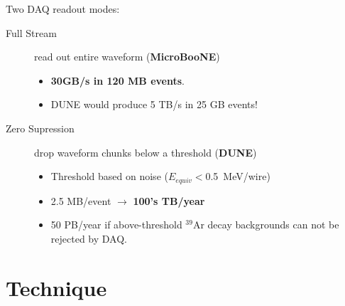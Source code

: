 \documentclass[xcolor=dvipsnames]{beamer}
\begin{document}
\begin{frame}
  \footnotesize
  Two DAQ readout modes:
  \begin{description}
  \item[Full Stream] read out entire waveform (\textbf{MicroBooNE})
    \begin{itemize}
    \item \textbf{30GB/s in 120 MB events}.
    \item DUNE would produce 5 TB/s in 25 GB events!
    \end{itemize}
  \item[Zero Supression] drop waveform chunks below a threshold (\textbf{DUNE})
    \begin{itemize}
    \item Threshold based on noise ($E_{equiv} <$\SI{0.5}{\mega\electronvolt}/wire)
    \item 2.5 MB/event $\rightarrow$ \textbf{100's TB/year}
    \item 50 PB/year if above-threshold $^{39}$Ar decay backgrounds can not be
      rejected by DAQ.
    \end{itemize}
  \end{description}

\end{frame}


\section{Technique}
\end{document}
